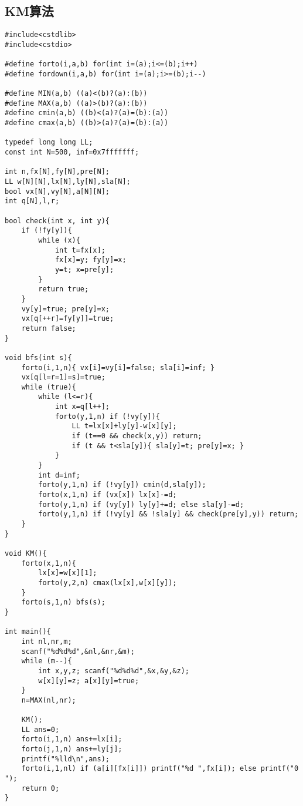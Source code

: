 \documentclass{article}
\begin{document}
\subsection{KM算法}
\begin{lstlisting}
#include<cstdlib>
#include<cstdio>

#define forto(i,a,b) for(int i=(a);i<=(b);i++)
#define fordown(i,a,b) for(int i=(a);i>=(b);i--)

#define MIN(a,b) ((a)<(b)?(a):(b))
#define MAX(a,b) ((a)>(b)?(a):(b))
#define cmin(a,b) ((b)<(a)?(a)=(b):(a))
#define cmax(a,b) ((b)>(a)?(a)=(b):(a))

typedef long long LL;
const int N=500, inf=0x7fffffff;

int n,fx[N],fy[N],pre[N];
LL w[N][N],lx[N],ly[N],sla[N];
bool vx[N],vy[N],a[N][N];
int q[N],l,r;

bool check(int x, int y){
	if (!fy[y]){
		while (x){
			int t=fx[x];
			fx[x]=y; fy[y]=x;
			y=t; x=pre[y];
		}
		return true;
	}
	vy[y]=true; pre[y]=x;
	vx[q[++r]=fy[y]]=true;
	return false;
}

void bfs(int s){
	forto(i,1,n){ vx[i]=vy[i]=false; sla[i]=inf; }
	vx[q[l=r=1]=s]=true;
	while (true){
		while (l<=r){
			int x=q[l++];
			forto(y,1,n) if (!vy[y]){
				LL t=lx[x]+ly[y]-w[x][y];
				if (t==0 && check(x,y)) return;
				if (t && t<sla[y]){ sla[y]=t; pre[y]=x; }
			}
		}
		int d=inf;
		forto(y,1,n) if (!vy[y]) cmin(d,sla[y]);
		forto(x,1,n) if (vx[x]) lx[x]-=d;
		forto(y,1,n) if (vy[y]) ly[y]+=d; else sla[y]-=d;
		forto(y,1,n) if (!vy[y] && !sla[y] && check(pre[y],y)) return;
	}
}

void KM(){
	forto(x,1,n){
		lx[x]=w[x][1];
		forto(y,2,n) cmax(lx[x],w[x][y]);
	}
	forto(s,1,n) bfs(s);
}

int main(){
	int nl,nr,m;
	scanf("%d%d%d",&nl,&nr,&m);
	while (m--){
		int x,y,z; scanf("%d%d%d",&x,&y,&z);
		w[x][y]=z; a[x][y]=true;
	}
	n=MAX(nl,nr);
	
	KM();
	LL ans=0;
	forto(i,1,n) ans+=lx[i];
	forto(j,1,n) ans+=ly[j];
	printf("%lld\n",ans);
	forto(i,1,nl) if (a[i][fx[i]]) printf("%d ",fx[i]); else printf("0 ");
	return 0;
}
\end{lstlisting}
\end{document}
